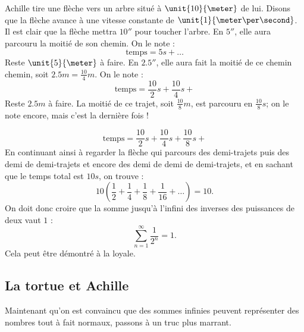 Achille tire une flèche vers un arbre situé à $\unit{10}{\meter}$ de lui. Disons que la flèche avance à une vitesse constante de $\unit{1}{\meter\per\second}$. Il est clair que la flèche mettra $\unit{10}{\second}$ pour toucher l'arbre. En $\unit{5}{\second}$, elle aura parcouru la moitié de son chemin. On le note :
\[
\text{temps}=5s+\ldots
\]
Reste \( \unit{5}{\meter}\) à faire. En $\unit{2.5}{\second}$, elle aura fait la moitié de ce chemin chemin, soit $2.5m=\frac{10}{4}m$. On le note :
\[
\text{temps}=\frac{10}{2}s+\frac{10}{4}s+
\]
Reste $2.5m$ à faire. La moitié de ce trajet, soit $\frac{10}{8}m$, est parcouru en $\frac{10}{8}s$; on le note encore, mais c'est la dernière fois !

\[
\text{temps}=\frac{10}{2}s+\frac{10}{4}s+\frac{10}{8}s+
\]
En continuant ainsi à regarder la flèche qui parcours des demi-trajets puis des demi de demi-trajets et encore des demi de demi de demi-trajets, et en sachant que le temps total est $10s$, on trouve :
\[
10\left( \frac{1}{2}+\frac{1}{4}+\frac{1}{8}+\frac{1}{16}+\ldots  \right)=10.
\]
On doit donc croire que la somme jusqu'à l'infini des inverses des puissances de deux vaut $1$ :
\[
   \sum_{n=1}^{\infty}\frac{1}{2^n}=1.
\]
Cela peut être démontré à la loyale.

\subsection{La tortue et Achille}

Maintenant qu'on est convaincu que des sommes infinies peuvent représenter des nombres tout à fait normaux, passons à un truc plus marrant.

